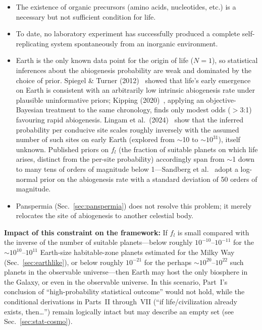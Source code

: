 \documentclass[aps,prd,twocolumn,superscriptaddress,nofootinbib]{revtex4-2}
\begin{document}
\begin{itemize}
  \item The existence of organic precursors (amino acids, nucleotides, etc.) is a necessary but not sufficient condition for life.
  \item To date, no laboratory experiment has successfully produced a complete self-replicating system spontaneously from an inorganic environment.
  \item Earth is the only known data point for the origin of life ($N=1$), so statistical inferences about the abiogenesis probability are weak and dominated by the choice of prior. Spiegel \& Turner (2012)~\cite{Spiegel2012} showed that life's early emergence on Earth is consistent with an arbitrarily low intrinsic abiogenesis rate under plausible uninformative priors; Kipping (2020)~\cite{Kipping2020}, applying an objective-Bayesian treatment to the same chronology, finds only modest odds ($>$3:1) favouring rapid abiogenesis. Lingam et al.\ (2024)~\cite{Lingam2024} show that the inferred probability per conducive site scales roughly inversely with the assumed number of such sites on early Earth (explored from ${\sim}$10 to ${\sim}10^{31}$), itself unknown. Published priors on $f_{l}$ (the fraction of suitable planets on which life arises, distinct from the per-site probability) accordingly span from ${\sim}$1 down to many tens of orders of magnitude below 1---Sandberg et al.~\cite{Sandberg2018} adopt a log-normal prior on the abiogenesis rate with a standard deviation of 50 orders of magnitude.
  \item Panspermia (Sec.~\ref{sec:panspermia}) does not resolve this problem; it merely relocates the site of abiogenesis to another celestial body.
\end{itemize}

\textbf{Impact of this constraint on the framework:} If $f_{l}$ is small compared with the inverse of the number of suitable planets---below roughly $10^{-10}$--$10^{-11}$ for the ${\sim}10^{10}$--$10^{11}$ Earth-size habitable-zone planets estimated for the Milky Way (Sec.~\ref{sec:earthlike}), or below roughly $10^{-21}$ for the perhaps ${\sim}10^{20}$--$10^{22}$ such planets in the observable universe---then Earth may host the only biosphere in the Galaxy, or even in the observable universe. In this scenario, Part~I's conclusion of ``high-probability statistical outcome'' would not hold, while the conditional derivations in Parts~II through~VII (``if life/civilization already exists, then\ldots{}'') remain logically intact but may describe an empty set (see Sec.~\ref{sec:stat-cosmo}).
\end{document}
